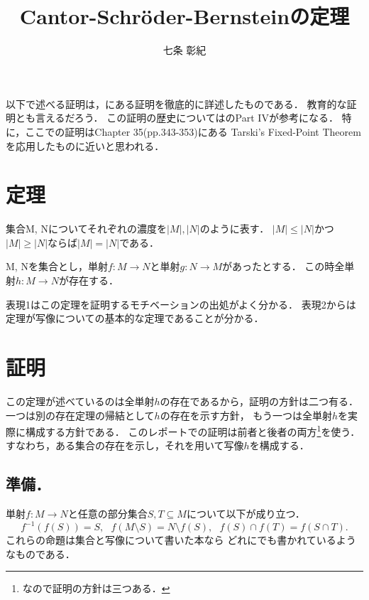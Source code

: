 \documentclass[a4j, 10pt]{jarticle}
\title{Cantor-Schr\"{o}der-Bernsteinの定理}
\author{七条 彰紀}
\begin{document}
    \maketitle
    
    以下で述べる証明は，\cite{thebook}にある証明を徹底的に詳述したものである．
    教育的な証明とも言えるだろう．
    この証明の歴史については\cite{cbt}のPart IVが参考になる．
    特に，ここでの証明はChapter 35(pp.343-353)にある
    Tarski’s Fixed-Point Theoremを応用したものに近いと思われる．

    \section{定理}
    \begin{Thm}[表現1]
        集合M, Nについてそれぞれの濃度を$|M|, |N|$のように表す．
        $|M| \leq |N|$かつ$|M| \geq |N|$ならば$|M|=|N|$である．
    \end{Thm}

    \begin{Thm}[表現2]
        M, Nを集合とし，単射$f:M \to N$と単射$g: N \to M$があったとする．
        この時全単射$h:M \to N$が存在する．
    \end{Thm}

    表現1はこの定理を証明するモチベーションの出処がよく分かる．
    表現2からは定理が写像についての基本的な定理であることが分かる．

    \section{証明}
    この定理が述べているのは全単射$h$の存在であるから，証明の方針は二つ有る．
    一つは別の存在定理の帰結として$h$の存在を示す方針，
    もう一つは全単射$h$を実際に構成する方針である．
    このレポートでの証明は前者と後者の両方\footnote{なので証明の方針は三つある．}を使う．
    すなわち，ある集合の存在を示し，それを用いて写像$h$を構成する．

    \subsection{準備．}
    単射$f: M \to N$と任意の部分集合$S,T \subseteq M$について以下が成り立つ．
    \[
        f^{-1}(f(S))=S,~~~
        f(M \setminus S)=N \setminus f(S),~~~
        f(S) \cap f(T)=f(S \cap T).
    \]
    これらの命題は集合と写像について書いた本なら
    どれにでも書かれているようなものである．
\end{document}
